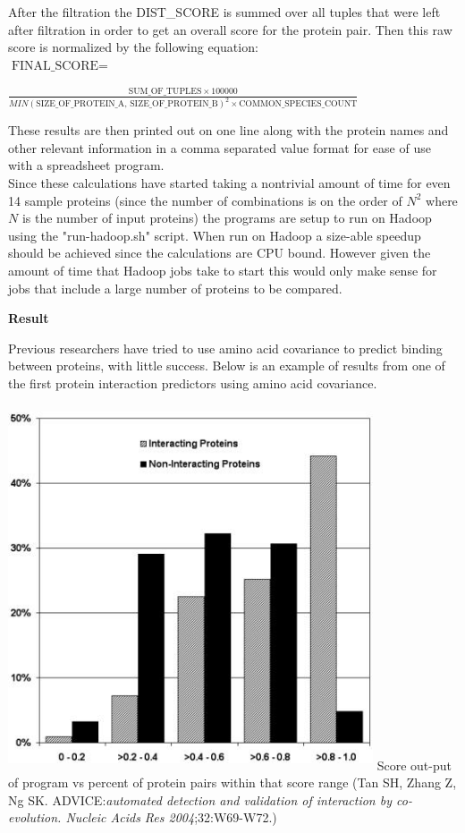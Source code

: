 \documentclass[11pt]{article}
\begin{document}
After the filtration the DIST\_SCORE is summed over all tuples that
were left after filtration in order to get an overall score for the
protein pair. Then this raw score is normalized by the following equation: \\

$\mbox{FINAL\_SCORE} = $ \\
\begin{center}
  $\frac{\mbox{SUM\_OF\_TUPLES} \times
    100000}{MIN(\mbox{SIZE\_OF\_PROTEIN\_A, SIZE\_OF\_PROTEIN\_B})^2
    \times \mbox{COMMON\_SPECIES\_COUNT}}$
\end{center}

These results are then printed out on one line along with the protein
names and other relevant information in a comma separated value format
for ease of use with a spreadsheet program. \\

Since these calculations have started taking a nontrivial amount of
time for even 14 sample proteins (since the number of combinations is
on the order of $N^2$ where $N$ is the number of input proteins) the
programs are setup to run on Hadoop using the "run-hadoop.sh"
script. When run on Hadoop a size-able speedup should be achieved
since the calculations are CPU bound. However given the
amount of time that Hadoop jobs take to start this would only make
sense for jobs that include a large number of proteins to be compared.

\begin{center}
\textbf{Result}
\end{center}

Previous researchers have tried to use amino acid covariance to predict binding between proteins, with little success.  
Below is an example of results from one of the first protein interaction predictors using amino acid covariance.

\includegraphics[width=4.25in,height=4.25in]{hi.png}
Score out-put of program vs percent of protein pairs within that score range (Tan SH, Zhang Z, Ng SK. ADVICE:\emph{automated detection and validation of interaction by co-evolution. Nucleic Acids Res 2004};32:W69-W72.)\\
\end{document}
